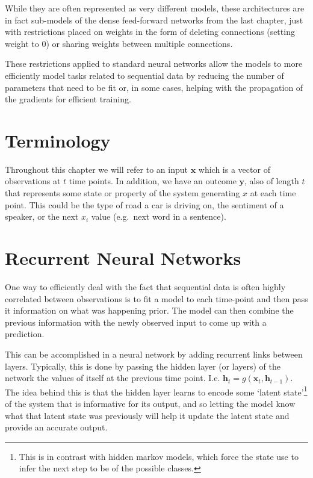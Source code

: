 \documentclass[]{book}
\let\rmarkdownfootnote\footnote%
\def\footnote{\protect\rmarkdownfootnote}
\theoremstyle{definition}
\theoremstyle{definition}
\theoremstyle{definition}
\theoremstyle{remark}
\begin{document}
While they are often represented as very different models, these
architectures are in fact sub-models of the dense feed-forward networks
from the last chapter, just with restrictions placed on weights in the
form of deleting connections (setting weight to 0) or sharing weights
between multiple connections.

These restrictions applied to standard neural networks allow the models
to more efficiently model tasks related to sequential data by reducing
the number of parameters that need to be fit or, in some cases, helping
with the propagation of the gradients for efficient training.

\section{Terminology}\label{terminology-1}

Throughout this chapter we will refer to an input \(\mathbf{x}\) which
is a vector of observations at \(t\) time points. In addition, we have
an outcome \(\mathbf{y}\), also of length \(t\) that represents some
state or property of the system generating \(x\) at each time point.
This could be the type of road a car is driving on, the sentiment of a
speaker, or the next \(x_i\) value (e.g.~next word in a sentence).

\section{Recurrent Neural Networks}\label{recurrent-neural-networks}

One way to efficiently deal with the fact that sequential data is often
highly correlated between observations is to fit a model to each
time-point and then pass it information on what was happening prior. The
model can then combine the previous information with the newly observed
input to come up with a prediction.

This can be accomplished in a neural network by adding recurrent links
between layers. Typically, this is done by passing the hidden layer (or
layers) of the network the values of itself at the previous time point.
I.e. \(\mathbf{h}_{t} = g(\mathbf{x}_t, \mathbf{h}_{t - 1})\). The idea
behind this is that the hidden layer learns to encode some `latent
state'\footnote{This is in contrast with hidden markov models, which
  force the state use to infer the next step to be of the possible
  classes.} of the system that is informative for its output, and so
letting the model know what that latent state was previously will help
it update the latent state and provide an accurate output.
\end{document}
